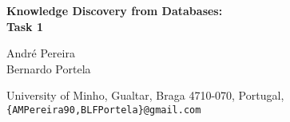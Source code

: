\documentclass[a4paper,abstract=on,twoside,parskip=full]{scrreprt}
\begin{document}

\begin{titlepage}
	\begin{center}
	\vspace{100pt}
		\textbf{\Large{Knowledge Discovery from Databases:\\Task 1}}
		
		\vspace{24pt}

		André Pereira \\
		Bernardo Portela
		
		\vspace{12pt}

		University of Minho, Gualtar, Braga 4710-070, Portugal,\\
		\texttt{\{AMPereira90,BLFPortela\}@gmail.com}
	\end{center}
\end{titlepage}

\pagestyle{fancy}
\renewcommand{\headrulewidth}{0.4pt}
\fancyhead[LO,RE]{}
\fancyhead[LE]{\slshape \leftmark}
\fancyhead[RO]{\slshape \rightmark}
\fancyfoot[RO,LE]{\thepage}%
\fancyfoot[C]{}

\fancypagestyle{plain}{%
  \renewcommand{\headrulewidth}{0.0pt}
  \fancyhead{}
  \fancyfoot[C]{}
  \fancyfoot[RO,LE]{\thepage}
}


\tableofcontents


%
%







%
\newpage %
\printbibliography[title=References]

%
\end{document}
